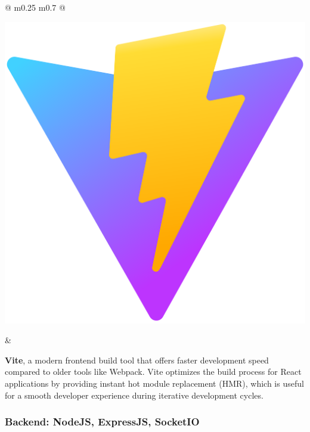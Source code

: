 	
	\vspace*{0.5 cm}
	
	\begin{tabular}{ @{} m{0.25\textwidth} m{0.7\textwidth} @{} }
		\begin{minipage}{\linewidth}
			\centering
			\includegraphics[width=0.45\linewidth]{graphics/vite.png}
			\label{fig:vite}
		\end{minipage}
		&
		\begin{minipage}{\linewidth}
			\textbf{Vite}, a modern frontend build tool that offers faster development speed compared to older tools like Webpack. Vite optimizes the build process for React applications by providing instant hot module replacement (HMR), which is useful for a smooth developer experience during iterative development cycles. \cite{vite} 
		\end{minipage}
	\end{tabular}
	\vspace*{0.5 cm}
	
	
	\subsubsection{Backend: NodeJS, ExpressJS, SocketIO}
	
